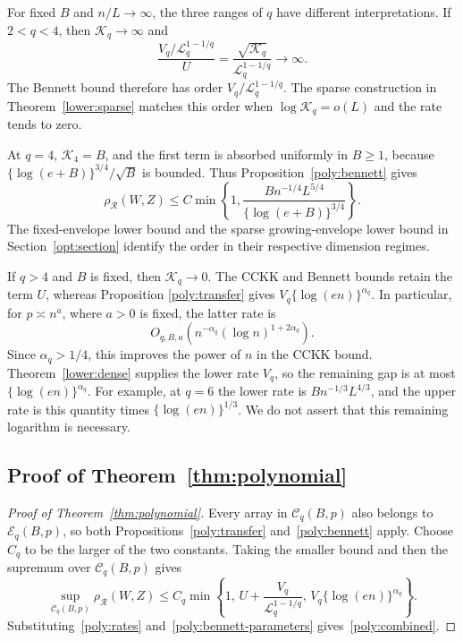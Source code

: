 \documentclass[11pt,letterpaper]{article}
\theoremstyle{remark}
\newcommand{\rh}{\rho_{\mathcal R}}
\begin{document}
For fixed \(B\) and \(n/L\to\infty\), the three ranges of \(q\)
have different interpretations. If \(2<q<4\), then \(\mathcal K_q\to\infty\)
and
\[
 \frac{V_q/\mathcal{L}_q^{1-1/q}}{U}
   =\frac{\sqrt{\mathcal K_q}}{\mathcal{L}_q^{1-1/q}}\longrightarrow\infty.
\]
The Bennett bound therefore has order \(V_q/\mathcal{L}_q^{1-1/q}\).
The sparse construction in Theorem~\ref{lower:sparse} matches this
order when \(\log \mathcal K_q=o(L)\) and the rate tends to zero.

At \(q=4\), \(\mathcal K_4=B\), and the first term is absorbed uniformly in
\(B\ge1\), because \(\{\log(e+B)\}^{3/4}/\sqrt B\) is bounded.
Thus Proposition~\ref{poly:bennett} gives
\begin{equation}
 \rh(W,Z)\le C\min\left\{1,
 \frac{Bn^{-1/4}L^{5/4}}{\{\log(e+B)\}^{3/4}}\right\}.
 \label{poly:q4}
\end{equation}
The fixed-envelope lower bound and the sparse growing-envelope lower
bound in Section~\ref{opt:section} identify the order in their respective
dimension regimes.

If \(q>4\) and \(B\) is fixed, then \(\mathcal K_q\to0\). The CCKK and
Bennett bounds retain the term \(U\), whereas Proposition
\ref{poly:transfer} gives \(V_q\{\log(en)\}^{\alpha_q}\). In particular, for
\(p\asymp n^a\), where \(a>0\) is fixed, the latter rate is
\[
 O_{q,B,a}\!\left(n^{-\alpha_q}(\log n)^{1+2\alpha_q}\right).
\]
Since \(\alpha_q>1/4\), this improves the power of \(n\) in the CCKK
bound. Theorem~\ref{lower:dense} supplies the lower rate \(V_q\), so
the remaining gap is at most \(\{\log(en)\}^{\alpha_q}\). For example, at
\(q=6\) the lower rate is \(Bn^{-1/3}L^{4/3}\), and the upper rate
is this quantity times \(\{\log(en)\}^{1/3}\). We do not assert that this
remaining logarithm is necessary.

\subsection{Proof of Theorem~\ref*{thm:polynomial}}\label{sec:proof-theorem-two}

\begin{proof}[Proof of Theorem~\ref{thm:polynomial}]
Every array in \(\mathcal C_q(B,p)\) also belongs to
\(\mathcal E_q(B,p)\), so both Propositions~\ref{poly:transfer}
and~\ref{poly:bennett} apply.
Choose \(C_q\) to be the larger of the two constants. Taking the
smaller bound and then the supremum over \(\mathcal C_q(B,p)\) gives
\[
 \sup_{\mathcal C_q(B,p)}\rh(W,Z)
 \le C_q\min\left\{1,\,
 U+\frac{V_q}{\mathcal L_q^{1-1/q}},\,
 V_q\{\log(en)\}^{\alpha_q}\right\}.
\]
Substituting~\eqref{poly:rates}
and~\eqref{poly:bennett-parameters} gives~\eqref{poly:combined}.
\end{proof}
\end{document}
